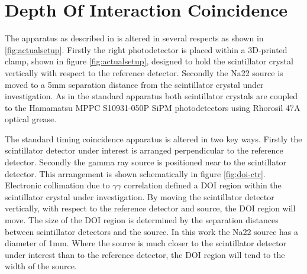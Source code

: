 \section{Depth Of Interaction Coincidence}
The apparatus as described in \cite{arron_Meyer_Pauwels_Lecoq_2012} is altered in several respects as shown in \ref{fig:actualsetup}. Firstly the right photodetector is placed within a 3D-printed clamp, shown in figure \ref{fig:actualsetup}, designed to hold the scintillator crystal vertically with respect to the reference detector. Secondly the Na22 source is moved to a 5mm separation distance from the scintillator crystal under investigation. As in the standard apparatus both scintillator crystals are coupled to the Hamamatsu MPPC S10931-050P SiPM photodetectors using Rhorosil 47A optical grease. 

The standard timing coincidence apparatus is altered in two key ways. Firstly the scintillator detector under interest is arranged perpendicular to the reference detector. Secondly the gamma ray source is positioned near to the scintillator detector. This arrangement is shown schematically in figure \ref{fig:doi-ctr}. Electronic collimation due to $\gamma\gamma$ correlation defined a DOI region within the scintillator crystal under investigation. By moving the scintillator detector vertically, with respect to the reference detector and source, the DOI region will move. The size of the DOI region is determined by the separation distances between scintillator detectors and the source. In this work the Na22 source has a diameter of 1mm. Where the source is much closer to the scintillator detector under interest than to the reference detector, the DOI region will tend to the width of the source.